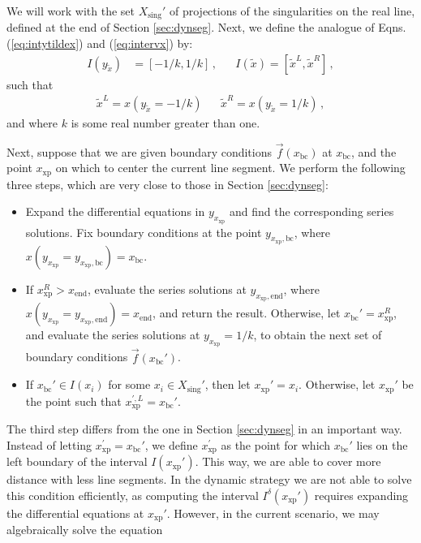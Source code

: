 \documentclass{article}
\begin{document}
We will work with the set $X_\text{sing}'$ of projections of the singularities on the real line, defined at the end of Section \ref{sec:dynseg}. Next, we define the analogue of Eqns. (\ref{eq:intytildex}) and (\ref{eq:intervx}) by:
\begin{align}
    I(y_{\tilde{x}}) &= [-1/k,1/k]\,, && I(\tilde{x}) = [\tilde{x}^{L}, \tilde{x}^{R}]\,,
\end{align}
such that
\begin{align}
    \tilde{x}^{L} = x(y_{\tilde{x}} = -1/k) && \tilde{x}^{R} = x(y_{\tilde{x}} = 1/k)\,,
\end{align}
and where $k$ is some real number greater than one. 

Next, suppose that we are given boundary conditions $\vec{f}(x_{\text{bc}})$ at $x_{\text{bc}}$, and the point $x_\text{xp}$ on which to center the current line segment. We perform the following three steps, which are very close to those in Section \ref{sec:dynseg}:
\begin{itemize}
    \item[1.] Expand the differential equations in $y_{x_{\text{xp}}}$ and find the corresponding series solutions. Fix boundary conditions at the point $y_{x_{\text{xp}},\text{bc}}$, where $x(y_{x_{\text{xp}}} = y_{x_{\text{xp}},\text{bc}}) = x_{\text{bc}}$.
    \item[2.] If $x_{\text{xp}}^{R} > x_{\text{end}}$, evaluate the series solutions at $y_{x_{\text{xp}},\text{end}}$, where $x(y_{x_{\text{xp}}} = y_{x_{\text{xp}},\text{end}}) = x_{\text{end}}$, and return the result. Otherwise, let $x_{\text{bc}}' = x_{\text{xp}}^{R}$, and evaluate the series solutions at $y_{x_{\text{xp}}}=1/k$, to obtain the next set of boundary conditions $\vec{f}(x_{\text{bc}}')$.
    \item[3.] If $x_{\text{bc}}' \in I(x_i)$ for some $x_i \in X_{\text{sing}}'$, then let $x_{\text{xp}}' = x_i$. Otherwise, let $x_{\text{xp}}'$ be the point such that $x_{\text{xp}}^{\prime, L} = x_{\text{bc}}'$.
\end{itemize}
The third step differs from the one in Section \ref{sec:dynseg} in an important way. Instead of letting $x_{\text{xp}}^{\prime} = x_{\text{bc}}'$, we define $x_{\text{xp}}^{\prime}$ as the point for which $x_{\text{bc}}'$ lies on the left boundary of the interval $I(x_{\text{xp}}')$. This way, we are able to cover more distance with less line segments. In the dynamic strategy we are not able to solve this condition efficiently, as computing the interval $I^{\delta}(x_{\text{xp}}')$ requires expanding the differential equations at $x_{\text{xp}}'$. However, in the current scenario, we may algebraically solve the equation
\end{document}
